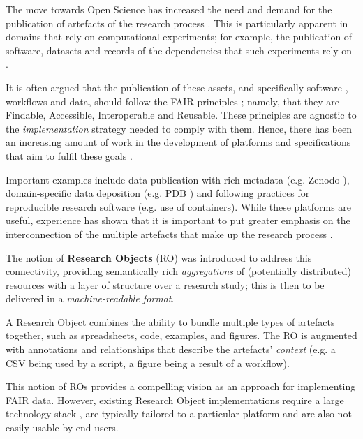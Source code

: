 \documentclass[ds,v1.1.2,openaccess]{iosart2x}%
\begin{document}
\label{sec:introduction}

The move towards Open Science has increased the need and demand for the
publication of artefacts of the research process
\cite{sefton_blog_post_2021}. This is particularly apparent in domains that
rely on computational experiments; for example, the publication of
software, datasets and records of the dependencies that such
experiments rely on \cite{doi:10.1126/science.aah6168}.

It is often argued that the publication of these assets, and
specifically software
\cite{doi:10.3233/DS-190026}, workflows \cite{doi:10.1162/dint_a_00033} and
data, should follow the FAIR principles \cite{doi:10.1038/sdata.2016.18};
namely, that they are Findable, Accessible, Interoperable and Reusable.
These principles are agnostic to the \textit{implementation} strategy needed
to comply with them. Hence, there has been an increasing amount of work
in the development of platforms and specifications that aim to fulfil
these goals \cite{isbn:9781315351148}.

Important examples include data publication with rich metadata (e.g.
Zenodo \cite{doi:10.3897/biss.3.37080}), domain-specific data deposition
(e.g. PDB \cite{doi:10.1093/nar/gkl971}) and following practices for
reproducible research software \cite{doi:10.1371/journal.pcbi.1003285}
(e.g. use of containers). While these platforms are useful, experience
has shown that it is important to put greater emphasis on the
interconnection of the multiple artefacts that make up the research
process \cite{doi:10.1016/j.ijhcs.2020.102562}.

The notion of \textbf{Research Objects} \cite{doi:10.1016/j.future.2011.08.004}
(RO) was introduced to address this connectivity, providing
semantically rich \textit{aggregations} of (potentially distributed) resources
with a layer of structure over a research study; this is then to be
delivered in a \textit{machine-readable format}.

A Research Object combines the ability to bundle multiple types of
artefacts together, such as spreadsheets, code, examples, and figures.
The RO is augmented with annotations and relationships that describe
the artefacts' \textit{context} (e.g. a CSV being used by a script, a figure
being a result of a workflow).

This notion of ROs provides a compelling vision as an approach for
implementing FAIR data. However, existing Research Object
implementations require a large technology stack
\cite{doi:10.1016/j.websem.2015.01.003}, are typically tailored to a
particular platform and are also not easily usable by end-users.
\end{document}
